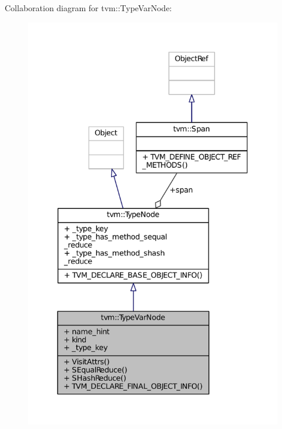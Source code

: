 Collaboration diagram for tvm\+:\+:Type\+Var\+Node\+:
\nopagebreak
\begin{figure}[H]
\begin{center}
\leavevmode
\includegraphics[width=337pt]{classtvm_1_1TypeVarNode__coll__graph}
\end{center}
\end{figure}
